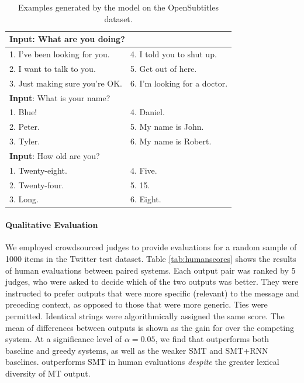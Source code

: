 \begin{table}[!ht]
\setlength{\tabcolsep}{4pt}
\center
\small
\begin{tabular}{ll}\toprule
\multicolumn{2}{l}{{\bf Input}: What are you doing?} \\\midrule
1. I've been looking for you.&4. I told you to shut up.\\
2. I want to talk to you. &5. Get out of here.\\
3. Just making sure you're OK.&6. I'm looking for a doctor. \\\midrule
\multicolumn{2}{l}{{\bf Input}: What is your name? }\\\midrule
1. Blue! & 4. Daniel. \\
2. Peter. &5. My name is John. \\
3. Tyler. &6. My name is Robert. \\\midrule
\multicolumn{2}{l}{{\bf Input}: How old are you?} \\\midrule
1. Twenty-eight. & 4. Five.\\
2. Twenty-four. & 5. 15.\\
3. Long.& 6. Eight.\\\bottomrule
\end{tabular}
\caption{Examples generated by the \mmiLM model on the OpenSubtitles dataset.} 
\label{sample:mmi}
\end{table}

\paragraph{Qualitative Evaluation}

We employed crowdsourced judges to provide evaluations for a random sample of 1000 items in the Twitter test dataset. 
Table \ref{tab:humanscores} shows the results of human evaluations between paired systems. 
Each output pair was ranked by 5 judges, who were asked to decide which of the two outputs was better. 
They were instructed to prefer outputs that were more specific (relevant) to the message and preceding context, as opposed to those that were more generic. 
Ties were permitted. 
Identical strings were algorithmically assigned the same score. 
The mean of differences between outputs is shown as the gain for \mmiBD over the competing system.
At a significance level of $\alpha = 0.05$, we find that \mmiBD outperforms both baseline and greedy \sts systems, as well as the weaker SMT and SMT+RNN baselines. 
\mmiBD outperforms SMT in human evaluations \textit{despite} the greater lexical diversity of MT output. 

